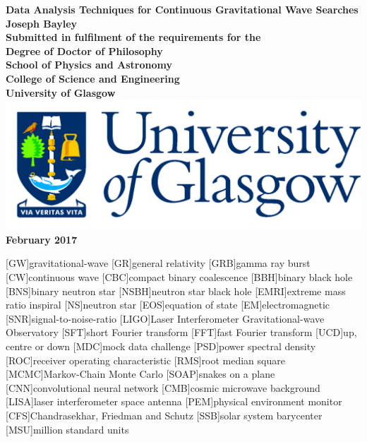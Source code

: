 \documentclass[12pt,titlepage,oneside]{book}
\begin{document}
\begin{titlepage}
\centering
\vspace*{3cm}  %
\bfseries\Large
Data Analysis Techniques for Continuous Gravitational Wave Searches\\
\vspace{3cm}
\normalfont\large
Joseph Bayley\\
\vspace{2cm}
Submitted in fulfilment of the requirements for the\\
Degree of Doctor of Philosophy\\
\vspace{2cm}
School of Physics and Astronomy\\
College of Science and Engineering\\
University of Glasgow\\
\vspace{1cm}
\includegraphics[scale=0.125]{GlaLogo.pdf}
\\
\vspace{1cm}
February 2017
\end{titlepage}
\frontmatter  %

\tableofcontents
\listoftables
\listoffigures



[GW]{gravitational-wave}
[GR]{general relativity}
[GRB]{gamma ray burst}
[CW]{continuous wave}
[CBC]{compact binary coalescence}
[BBH]{binary black hole}
[BNS]{binary neutron star}
[NSBH]{neutron star black hole}
[EMRI]{extreme mass ratio inspiral}
[NS]{neutron star}
[EOS]{equation of state}
[EM]{electromagnetic}
[SNR]{signal-to-noise-ratio}
[LIGO]{Laser Interferometer Gravitational-wave Observatory}
[SFT]{short Fourier transform}
[FFT]{fast Fourier transform}
[UCD]{up, centre or down}
[MDC]{mock data challenge}
[PSD]{power spectral density}
[ROC]{receiver operating characteristic}
[RMS]{root median square}
[MCMC]{Markov-Chain Monte Carlo}
[SOAP]{snakes on a plane}
[CNN]{convolutional neural network}
[CMB]{cosmic microwave background}
[LISA]{laser interferometer space antenna}
[PEM]{physical environment monitor}
[CFS]{Chandrasekhar, Friedman and Schutz}
[SSB]{solar system barycenter}
[MSU]{million standard units}
\end{document}
